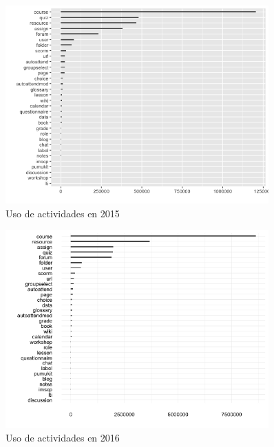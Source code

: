 \begin{figure}[H]
\centering
\includegraphics[width=0.9\textwidth]{../r/usoactividades_2015}
\caption{Uso de actividades en 2015}
\label{fig:usoactividades_2015}
\end{figure}

\begin{figure}[H]
\centering
\includegraphics[width=0.9\textwidth]{../r/usoactividades_2016}
\caption{Uso de actividades en 2016}
\label{fig:usoactividades_2016}
\end{figure}

